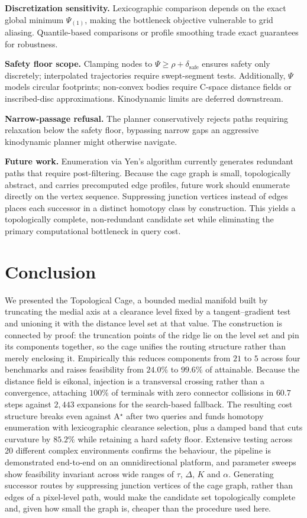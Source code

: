 \documentclass[conference]{IEEEtran}
\begin{document}
\textbf{Discretization sensitivity.} Lexicographic comparison depends on the exact global minimum $\Psi_{(1)}$, making the bottleneck objective vulnerable to grid aliasing. Quantile-based comparisons or profile smoothing trade exact guarantees for robustness.

\textbf{Safety floor scope.} Clamping nodes to $\Psi\ge\rho+\delta_{\mathrm{safe}}$ ensures safety only discretely; interpolated trajectories require swept-segment tests. Additionally, $\Psi$ models circular footprints; non-convex bodies require C-space distance fields or inscribed-disc approximations. Kinodynamic limits are deferred downstream.

\textbf{Narrow-passage refusal.} The planner conservatively rejects paths requiring relaxation below the safety floor, bypassing narrow gaps an aggressive kinodynamic planner might otherwise navigate.

\textbf{Future work.} Enumeration via Yen's algorithm currently generates redundant paths that require post-filtering. Because the cage graph is small, topologically abstract, and carries precomputed edge profiles, future work should enumerate directly on the vertex sequence. Suppressing junction vertices instead of edges places each successor in a distinct homotopy class by construction. This yields a topologically complete, non-redundant candidate set while eliminating the primary computational bottleneck in query cost.

\section{Conclusion}

We presented the Topological Cage, a bounded medial manifold built by truncating the medial axis at a clearance level fixed by a tangent--gradient test and unioning it with the distance level set at that value. The construction is connected by proof: the truncation points of the ridge lie on the level set and pin its components together, so the cage unifies the routing structure rather than merely enclosing it. Empirically this reduces components from $21$ to $5$ across four benchmarks and raises feasibility from $24.0\%$ to $99.6\%$ of attainable. Because the distance field is eikonal, injection is a transversal crossing rather than a convergence, attaching $100\%$ of terminals with zero connector collisions in $60.7$ steps against $2{,}443$ expansions for the search-based fallback. The resulting cost structure breaks even against A$^\star$ after two queries and funds homotopy enumeration with lexicographic clearance selection, plus a damped band that cuts curvature by $85.2\%$ while retaining a hard safety floor. Extensive testing across 20 different complex environments confirms the behaviour, the pipeline is demonstrated end-to-end on an omnidirectional platform, and parameter sweeps show feasibility invariant across wide ranges of $\tau$, $\Delta$, $K$ and $\alpha$. Generating successor routes by suppressing junction vertices of the cage graph, rather than edges of a pixel-level path, would make the candidate set topologically complete and, given how small the graph is, cheaper than the procedure used here.
\end{document}
